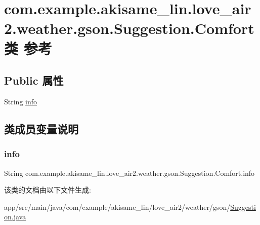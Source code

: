\hypertarget{classcom_1_1example_1_1akisame__lin_1_1love__air2_1_1weather_1_1gson_1_1_suggestion_1_1_comfort}{}\section{com.\+example.\+akisame\+\_\+lin.\+love\+\_\+air2.\+weather.\+gson.\+Suggestion.\+Comfort类 参考}
\label{classcom_1_1example_1_1akisame__lin_1_1love__air2_1_1weather_1_1gson_1_1_suggestion_1_1_comfort}
\subsection*{Public 属性}
\begin{DoxyCompactItemize}
\item 
String \mbox{\hyperlink{classcom_1_1example_1_1akisame__lin_1_1love__air2_1_1weather_1_1gson_1_1_suggestion_1_1_comfort_aadb27043e0ef5a305942b5b36f3a9f82}{info}}
\end{DoxyCompactItemize}


\subsection{类成员变量说明}
\mbox{\label{classcom_1_1example_1_1akisame__lin_1_1love__air2_1_1weather_1_1gson_1_1_suggestion_1_1_comfort_aadb27043e0ef5a305942b5b36f3a9f82}} 
\subsubsection{\texorpdfstring{info}{info}}
{\footnotesize\ttfamily String com.\+example.\+akisame\+\_\+lin.\+love\+\_\+air2.\+weather.\+gson.\+Suggestion.\+Comfort.\+info}



该类的文档由以下文件生成\+:\begin{DoxyCompactItemize}
\item 
app/src/main/java/com/example/akisame\+\_\+lin/love\+\_\+air2/weather/gson/\mbox{\hyperlink{java_2com_2example_2akisame__lin_2love__air2_2weather_2gson_2_suggestion_8java}{Suggestion.\+java}}\end{DoxyCompactItemize}
